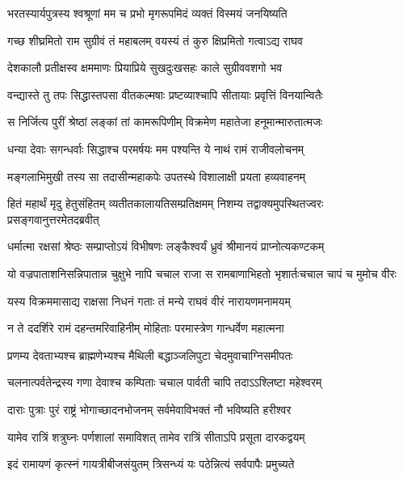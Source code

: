 \twolineshloka
{भरतस्यार्यपुत्रस्य श्वश्रूणां मम च प्रभो}
{मृगरूपमिदं व्यक्तं विस्मयं जनयिष्यति}%

\twolineshloka
{गच्छ शीघ्रमितो राम सुग्रीवं तं महाबलम्}
{वयस्यं तं कुरु क्षिप्रमितो गत्वाऽद्य राघव}%

\twolineshloka
{देशकालौ प्रतीक्षस्व क्षममाणः प्रियाप्रिये}
{सुखदुःखसहः काले  सुग्रीववशगो भव}%

\twolineshloka
{वन्द्यास्ते तु तपः सिद्धास्तपसा वीतकल्मषाः}
{प्रष्टव्याश्चापि सीतायाः प्रवृत्तिं विनयान्वितैः}%

\twolineshloka
{स निर्जित्य पुरीं श्रेष्ठां लङ्कां तां कामरूपिणीम्}
{विक्रमेण महातेजा हनूमान्मारुतात्मजः}%

\twolineshloka
{धन्या देवाः सगन्धर्वाः सिद्धाश्च परमर्षयः}
{मम पश्यन्ति ये नाथं रामं राजीवलोचनम्}%

\twolineshloka
{मङ्गलाभिमुखी तस्य सा तदासीन्महाकपेः}
{उपतस्थे विशालाक्षी प्रयता हव्यवाहनम्}%

\fourlineindentedshloka
{हितं महार्थं मृदु हेतुसंहितम्}
{व्यतीतकालायतिसम्प्रतिक्षमम्}
{निशम्य तद्वाक्यमुपस्थितज्वरः}
{प्रसङ्गवानुत्तरमेतदब्रवीत्}%

\twolineshloka
{धर्मात्मा रक्षसां श्रेष्ठः सम्प्राप्तोऽयं विभीषणः}
{लङ्कैश्वर्यं ध्रुवं श्रीमानयं प्राप्नोत्यकण्टकम्}%

\fourlineindentedshloka
{यो वज्रपाताशनिसन्निपातान्}{न चुक्षुभे नापि चचाल राजा}
{स रामबाणाभिहतो भृशार्तः}{चचाल चापं च मुमोच वीरः}%

\twolineshloka
{यस्य विक्रममासाद्य राक्षसा निधनं गताः}
{तं मन्ये राघवं वीरं नारायणमनामयम्}%

\twolineshloka
{न ते ददर्शिरे रामं दहन्तमरिवाहिनीम्}
{मोहिताः परमास्त्रेण गान्धर्वेण महात्मना}%

\twolineshloka
{प्रणम्य देवताभ्यश्च ब्राह्मणेभ्यश्च मैथिली}
{बद्धाञ्जलिपुटा चेदमुवाचाग्निसमीपतः}%

\twolineshloka
{चलनात्पर्वतेन्द्रस्य गणा देवाश्च कम्पिताः}
{चचाल पार्वती चापि तदाऽऽश्लिष्टा महेश्वरम्} %

\twolineshloka
{दाराः पुत्राः पुरं राष्ट्रं भोगाच्छादनभोजनम्}
{सर्वमेवाविभक्तं नौ भविष्यति हरीश्वर}%

\twolineshloka
{यामेव रात्रिं शत्रुघ्नः पर्णशालां समाविशत्}
{तामेव रात्रिं सीताऽपि प्रसूता दारकद्वयम्}%

\twolineshloka
{इदं रामायणं कृत्स्नं गायत्रीबीजसंयुतम्}
{त्रिसन्ध्यं यः पठेन्नित्यं सर्वपापैः प्रमुच्यते}

